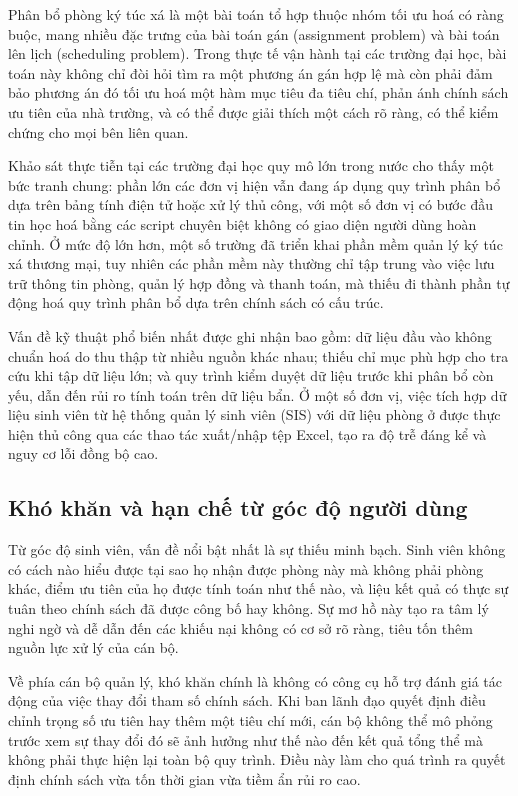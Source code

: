﻿\documentclass[a4paper,12pt,openany,oneside]{report}
\begin{document}
Phân bổ phòng ký túc xá là một bài toán tổ hợp thuộc nhóm tối ưu hoá có ràng
buộc, mang nhiều đặc trưng của bài toán gán (assignment problem) và bài toán lên
lịch (scheduling problem). Trong thực tế vận hành tại các trường đại học, bài
toán này không chỉ đòi hỏi tìm ra một phương án gán hợp lệ mà còn phải đảm bảo
phương án đó tối ưu hoá một hàm mục tiêu đa tiêu chí, phản ánh chính sách ưu
tiên của nhà trường, và có thể được giải thích một cách rõ ràng, có thể kiểm
chứng cho mọi bên liên quan.

Khảo sát thực tiễn tại các trường đại học quy mô lớn trong nước cho thấy một
bức tranh chung: phần lớn các đơn vị hiện vẫn đang áp dụng quy trình phân bổ
dựa trên bảng tính điện tử hoặc xử lý thủ công, với một số đơn vị có bước đầu
tin học hoá bằng các script chuyên biệt không có giao diện người dùng hoàn
chỉnh. Ở mức độ lớn hơn, một số trường đã triển khai phần mềm quản lý ký túc
xá thương mại, tuy nhiên các phần mềm này thường chỉ tập trung vào việc lưu trữ
thông tin phòng, quản lý hợp đồng và thanh toán, mà thiếu đi thành phần tự động
hoá quy trình phân bổ dựa trên chính sách có cấu trúc.

Vấn đề kỹ thuật phổ biến nhất được ghi nhận bao gồm: dữ liệu đầu vào không chuẩn
hoá do thu thập từ nhiều nguồn khác nhau; thiếu chỉ mục phù hợp cho tra cứu khi
tập dữ liệu lớn; và quy trình kiểm duyệt dữ liệu trước khi phân bổ còn yếu,
dẫn đến rủi ro tính toán trên dữ liệu bẩn. Ở một số đơn vị, việc tích hợp dữ
liệu sinh viên từ hệ thống quản lý sinh viên (SIS) với dữ liệu phòng ở được
thực hiện thủ công qua các thao tác xuất/nhập tệp Excel, tạo ra độ trễ đáng kể
và nguy cơ lỗi đồng bộ cao.

\subsection{Khó khăn và hạn chế từ góc độ người dùng}

Từ góc độ sinh viên, vấn đề nổi bật nhất là sự thiếu minh bạch. Sinh viên không
có cách nào hiểu được tại sao họ nhận được phòng này mà không phải phòng khác,
điểm ưu tiên của họ được tính toán như thế nào, và liệu kết quả có thực sự tuân
theo chính sách đã được công bố hay không. Sự mơ hồ này tạo ra tâm lý nghi ngờ
và dễ dẫn đến các khiếu nại không có cơ sở rõ ràng, tiêu tốn thêm nguồn lực xử
lý của cán bộ.

Về phía cán bộ quản lý, khó khăn chính là không có công cụ hỗ trợ đánh giá tác
động của việc thay đổi tham số chính sách. Khi ban lãnh đạo quyết định điều
chỉnh trọng số ưu tiên hay thêm một tiêu chí mới, cán bộ không thể mô phỏng
trước xem sự thay đổi đó sẽ ảnh hưởng như thế nào đến kết quả tổng thể mà không
phải thực hiện lại toàn bộ quy trình. Điều này làm cho quá trình ra quyết định
chính sách vừa tốn thời gian vừa tiềm ẩn rủi ro cao.
\end{document}
